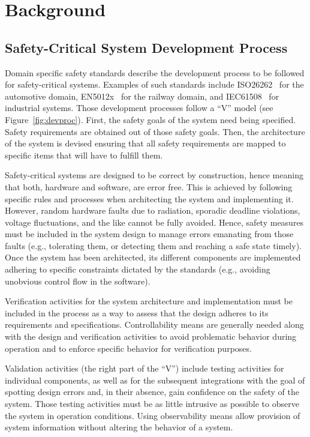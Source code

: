 \section{Background}
\label{sec:back}


\subsection{Safety-Critical System Development Process}

Domain specific safety standards describe the development process to be followed for safety-critical systems. Examples of such standards include ISO26262~\cite{ISO26262} for the automotive domain, EN5012x~\cite{EN50126,EN50128,EN50129} for the railway domain, and IEC61508~\cite{IEC61508} for industrial systems. Those development processes follow a ``V'' model (see Figure~\ref{fig:devproc}). First, the safety goals of the system need being specified. Safety requirements are obtained out of those safety goals. Then, the architecture of the system is devised ensuring that all safety requirements are mapped to specific items that will have to fulfill them. 

Safety-critical systems are designed to be correct by construction, hence meaning that both, hardware and software, are error free. This is achieved by following specific rules and processes when architecting the system and implementing it. However, random hardware faults due to radiation, sporadic deadline violations, voltage fluctuations, and the like cannot be fully avoided. Hence, safety measures must be included in the system design to manage errors emanating from those faults (e.g., tolerating them, or detecting them and reaching a safe state timely). Once the system has been architected, its different components are implemented adhering to specific constraints dictated by the standards (e.g., avoiding unobvious control flow in the software).

Verification activities for the system architecture and implementation must be included in the process as a way to assess that the design adheres to its requirements and specifications. Controllability means are generally needed along with the design and verification activities to avoid problematic behavior during operation and to enforce specific behavior for verification purposes.

Validation activities (the right part of the ``V'') include testing activities for individual components, as well as for the subsequent integrations with the goal of spotting design errors and, in their absence, gain confidence on the safety of the system. Those testing activities must be as little intrusive as possible to observe the system in operation conditions. Using observability means allow provision of system information without altering the behavior of a system.

